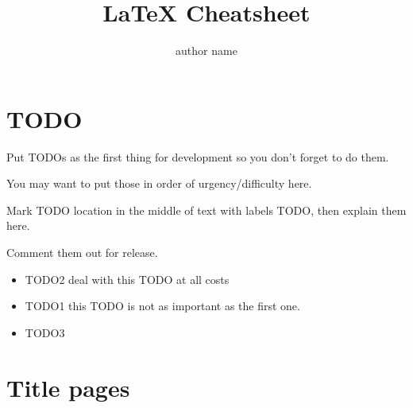 \documentclass[12pt]{article}
\title{LaTeX Cheatsheet}
\author{author name}
\begin{document}
\tableofcontents
\newpage

\section{TODO}

\begin{remark}
Put TODOs as the first \label{TODO2} thing for development so you don't forget to do them.

You may want to put those in order of urgency/difficulty here.

Mark TODO location in \label{TODO1} the middle of text with labels TODO, then explain them here.

Comment them out for release.
\end{remark}

\begin{itemize}
\item TODO2 deal with this TODO at all costs
\item TODO1 this TODO is not as important as the first one.
\item TODO3
\end{itemize}

\section{Title pages} \label{title-pages}

\maketitle
\newpage
\end{document}
